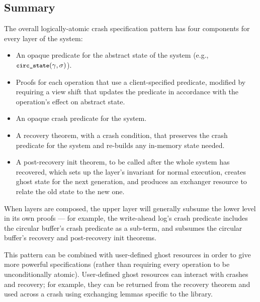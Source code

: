 \subsection{Summary}

The overall logically-atomic crash specification pattern has four components for
every layer of the system:

\begin{itemize}
  \item An opaque predicate for the abstract state of the system (e.g.,
        $\circstate(\gamma, \sigma)$).
  \item Proofs for each operation that use a client-specified predicate,
        modified by requiring a view shift that updates the predicate in
        accordance with the operation's effect on abstract state.
  \item An opaque crash predicate for the system.
  \item A recovery theorem, with a crash condition, that preserves the crash
  predicate for the system and re-builds any in-memory state needed.
  \item A post-recovery init theorem, to be called after the whole system has
        recovered, which sets up the layer's invariant for normal execution,
        creates ghost state for the next generation, and produces an exchanger
        resource to relate the old state to the new one.
\end{itemize}

When layers are composed, the upper layer will generally subsume the lower level
in its own proofs --- for example, the write-ahead log's crash predicate
includes the circular buffer's crash predicate as a sub-term, and subsumes the
circular buffer's recovery and post-recovery init theorems.

This pattern can be combined with user-defined ghost resources in order to give
more powerful specifications (rather than requiring every operation to be
unconditionally atomic). User-defined ghost resources can interact with crashes
and recovery; for example, they can be returned from the recovery theorem and
used across a crash using exchanging lemmas specific to the library.
